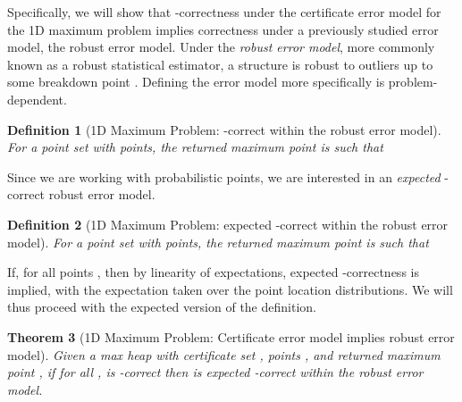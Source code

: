 \documentclass[11pt]{article}
\newtheorem{theorem}{\textbf{Theorem}}[section]
\newtheorem{definition}[theorem]{Definition}
\begin{document}
 
Specifically, we will show that -correctness under the certificate error model for the 1D maximum problem implies correctness under a previously studied error model, the robust error model.  Under the \emph{robust error model}, more commonly known as a robust statistical estimator, a structure is robust to outliers up to some breakdown point \cite{Rousseeuw05Robust}.  Defining the error model more specifically is problem-dependent.
\begin{definition}[1D Maximum Problem: -correct within the robust error model]
For a point set  with  points, the returned maximum point  is such that

\end{definition}

Since we are working with probabilistic points, we are interested in an \emph{expected} -correct robust error model.

\begin{definition}[1D Maximum Problem: expected -correct within the robust error model]
For a point set  with  points, the returned maximum point  is such that

\end{definition}

\noindent If, for all points ,  then by linearity of expectations, expected -correctness is implied, with the expectation taken over the point location distributions.  We will thus proceed with the expected version of the definition.


\begin{theorem}[1D Maximum Problem: Certificate error model implies robust error model]
\label{thm:1dmax}
Given a max heap with certificate set , points , and returned maximum point ,
if for all ,  is -correct
then
 is expected -correct within the robust error model.
\end{theorem}
\end{document}
